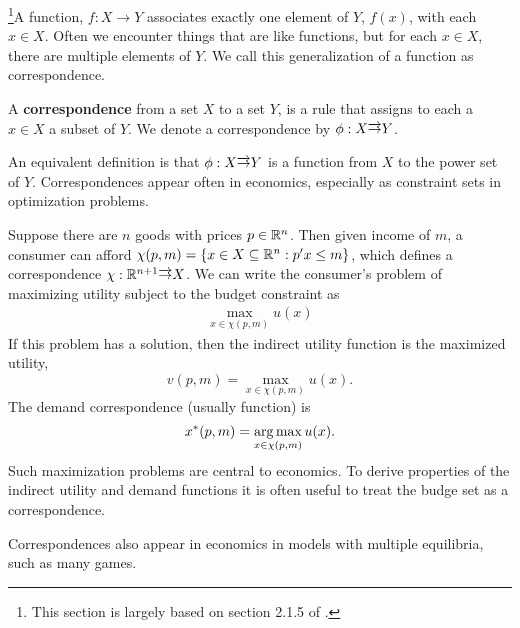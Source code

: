 \footnote{This section is largely based on section 2.1.5 of
  \cite{carter2001}.}A function, $f:X \to Y$ associates exactly one
element of $Y$, $f(x)$, with each $x \in X$. Often we encounter things
that are like functions, but for each $x \in X$, there are multiple
elements of $Y$. We call this generalization of a function as
correspondence.
\begin{definition}
  A \textbf{correspondence} from a set $X$ to a set $Y$, is a rule
  that assigns to each a $x \in X$ a subset of $Y$. We denote a
  correspondence by $\phi: X \overrightarrow{\rightarrow} Y$.
\end{definition}
An equivalent definition is that $\phi: X \overrightarrow{\rightarrow} Y$ is a function
from $X$ to the power set of $Y$. Correspondences appear often in
economics, especially as constraint sets in optimization problems.
\begin{example}
  Suppose there are $n$ goods with prices $p \in \mathbb{R}^n$. Then given
  income of $m$, a consumer can afford $\chi(p,m)=\{ x \in X \subseteq
  \mathbb{R}^n: p'x \leq m\}$, which defines a correspondence $\chi: \mathbb{R}^{n+1}
  \overrightarrow{\rightarrow} X$. We can write the consumer's problem of maximizing
  utility subject to the budget constraint as
  \begin{align*}
    \max_{x \in \chi(p,m)} u(x) 
  \end{align*}
  If this problem has a solution, then the indirect utility function
  is the maximized utility,
  \[ v(p,m) = \max_{x \in \chi(p,m)} u(x). \]
  The demand correspondence (usually function) is
  \[ x^*(p,m) = \argmax_{x \in \chi(p,m)} u(x). \] 
  Such maximization problems are central to economics. To derive
  properties of the indirect utility and demand functions it is often
  useful to treat the budge set as a correspondence.
\end{example}
Correspondences also appear in economics in models with multiple
equilibria, such as many games.

